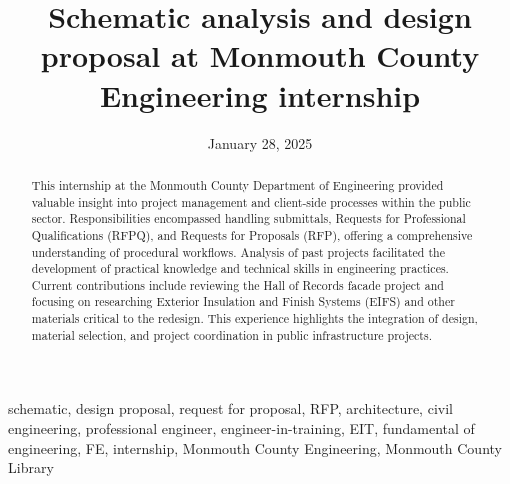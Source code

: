 \documentclass[12pt,conference,onecolumn]{IEEEtran}
\title{Schematic analysis and design proposal at Monmouth County Engineering internship}
\author{%
\IEEEauthorblockN{Chloe Li}\IEEEauthorblockA{Science \& Engineering\\Manalapan High School\\Englishtown, NJ\\425cli@frhsd.com}}
\date{January 28, 2025}
\newcommand{\keywords}{schematic, design proposal, request for proposal, RFP, architecture, civil engineering, professional engineer, engineer-in-training, EIT, fundamental of engineering, FE, internship, Monmouth County Engineering, Monmouth County Library
}
\begin{document}
\maketitle 

\begin{abstract}
This internship at the Monmouth County Department of Engineering provided valuable insight into project management and client-side processes within the public sector. Responsibilities encompassed handling submittals, Requests for Professional Qualifications (RFPQ), and Requests for Proposals (RFP), offering a comprehensive understanding of procedural workflows. Analysis of past projects facilitated the development of practical knowledge and technical skills in engineering practices. Current contributions include reviewing the Hall of Records facade project and focusing on researching Exterior Insulation and Finish Systems (EIFS) and other materials critical to the redesign. This experience highlights the integration of design, material selection, and project coordination in public infrastructure projects.
\end{abstract}

\begin{IEEEkeywords}
\keywords
\end{IEEEkeywords}
\end{document}
